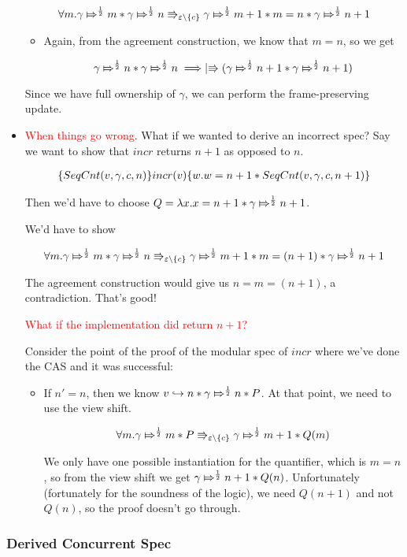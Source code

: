 \begin{itemize}
\[
\forall m. \apointsto{\gamma}{m}{\frac{1}{2}} * \apointsto{\gamma}{n}{\frac{1}{2}} \Rrightarrow_{\varepsilon \backslash \{c\}} \apointsto{\gamma}{m + 1}{\frac{1}{2}} * m = n * \apointsto{\gamma}{n + 1}{\frac{1}{2}}
\]

\begin{itemize}
\item Again, from the agreement construction, we know that $m = n$, so we get

\[
\apointsto{\gamma}{n}{\frac{1}{2}} * \apointsto{\gamma}{n}{\frac{1}{2}} \implies \upmod{ (\apointsto{\gamma}{n + 1}{\frac{1}{2}} * \apointsto{\gamma}{n + 1}{\frac{1}{2}}) }
\]
\end{itemize}

Since we have full ownership of $\gamma$, we can perform the frame-preserving update.

\item \textcolor{red}{When things go wrong}. What if we wanted to derive an incorrect spec?
Say we want to show that $incr$ returns $n + 1$ as opposed to $n$.

\begin{align*}
\hot{\SCnt{v}{\gamma}{c}{n}}{incr(v)}{w. w = n + 1 * \SCnt{v}{\gamma}{c}{n + 1}}
\end{align*}

Then we'd have to choose $Q = \lambda x. x = n + 1 * \apointsto{\gamma}{n + 1}{\frac{1}{2}}$.

We'd have to show


\[
\forall m. \apointsto{\gamma}{m}{\frac{1}{2}} * \apointsto{\gamma}{n}{\frac{1}{2}} \Rrightarrow_{\varepsilon \backslash \{c\}} \apointsto{\gamma}{m + 1}{\frac{1}{2}} * m = (n + 1) * \apointsto{\gamma}{n + 1}{\frac{1}{2}}
\]

The agreement construction would give us $n = m = (n + 1)$, a contradiction. That's good!

\textcolor{red}{What if the implementation did return $n + 1$?}

Consider the point of the proof of the modular spec of $incr$ where we've done the CAS and it was successful:

\begin{itemize}
\item If $n' = n$, then we know $\pointsto{v}{n} * \apointsto{\gamma}{n}{\frac{1}{2}} * P$.
At that point, we need to use the view shift.

\[
\forall m. \apointsto{\gamma}{m}{\frac{1}{2}} * P \Rrightarrow_{\varepsilon \backslash \{c\}} \apointsto{\gamma}{m + 1}{\frac{1}{2}} * Q(m)
\]

We only have one possible instantiation for the quantifier, which is $m = n$, so from the view shift we get $\apointsto{\gamma}{n + 1}{\frac{1}{2}} * Q(n)$. Unfortunately (fortunately for the soundness of the logic), we need $Q(n + 1)$ and not $Q(n)$, so the proof doesn't go through.
\end{itemize}

\end{itemize}

\subsubsection{Derived Concurrent Spec}